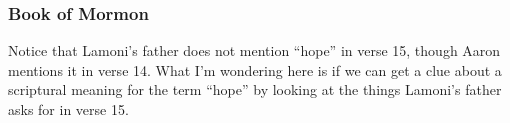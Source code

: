 				
		
	\subsubsection{Book of Mormon} %
		\label{HOPE-BOM}
	
		
		\begin{compactdesc}
			\item[{\hyperref[ALMA-22-16]{Alma 22:16}}] \phantom{.}
				\begin{compactitem}
					\item Notice that Lamoni's father does not mention ``hope'' in verse 15, though Aaron mentions it in verse 14. What I'm wondering here is if we can get a clue about a scriptural meaning for the term ``hope'' by looking at the things Lamoni's father asks for in verse 15.
				\end{compactitem}
		\end{compactdesc}
		
	
		
		
	
